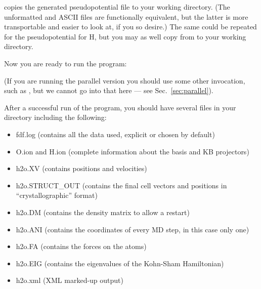 
\noindent
copies the generated pseudopotential file to your working directory.
(The unformatted and ASCII files are functionally equivalent, but
the latter is more transportable and easier to look at, if you so
desire.) The same could be repeated for the pseudopotential for H,
but you may as well copy  from 
to your  working directory.

\noindent
Now you are ready to run the program:


\noindent
(If you are running the parallel version you should use some other
invocation, such as , but we cannot
go into that here --- see Sec.~\ref{sec:parallel}).

After a successful run of the program, you should have several
files in your directory including the following:
\begin{itemize}

\item fdf.log
 (contains all the data used, explicit or chosen by default)
\item O.ion and H.ion
 (complete information about the basis and KB projectors)
\item h2o.XV
 (contains positions and velocities)
\item h2o.STRUCT\_OUT
 (contains the final cell vectors and positions in
 ``crystallographic'' format)
\item h2o.DM
 (contains the density matrix to allow a restart)
\item h2o.ANI
 (contains the coordinates of every MD step, in this case only one)
\item h2o.FA
 (contains the forces on the atoms)
\item h2o.EIG
 (contains the eigenvalues of the Kohn-Sham Hamiltonian)
\item h2o.xml
 (XML marked-up output)
\end{itemize}

